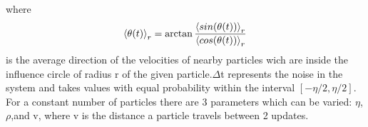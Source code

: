 \documentclass[twoside,twocolumn]{article}
\begin{document}
where 
\begin{equation}
\braket{\theta(t)}_r=\arctan\frac{\braket{sin(\theta(t))}_r}{\braket{cos(\theta(t))}_r}
\end{equation}
is the average direction of the velocities of nearby particles wich are inside the influence circle of radius r of the given particle.$\Delta$t represents the noise in the system and takes values with equal probability within the interval $[-\eta/2,\eta/2]$. For a constant number of particles there are 3 parameters which can be varied: $\eta$,$\rho$,and v, where v is the distance a particle travels between 2 updates.
\begin{figure}[!htb]
	\centering

\end{figure}
\end{document}
